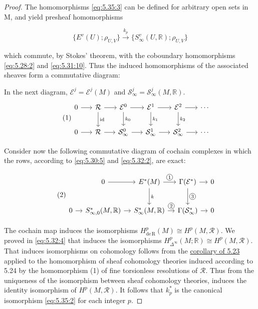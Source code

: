 \begin{proof}
The homomorphisms \eqref{eq:5.35:3} can be defined for arbitrary open sets in M, and yield presheaf homomorphisms

\[
\{E^{v}(U);\rho_{U,V}\}\xrightarrow{k_{p}}\{S_{\infty}^{v}(U,\mathbb{R});\rho_{U,V}\}
\]

which commute, by Stokes' theorem, with the coboundary homomorphisms \eqref{eq:5.28:2} and \eqref{eq:5.31:10}. Thus the induced homomorphisms of the associated sheaves form a commutative diagram:

In the next diagram, $\mathcal E^j=\mathcal E^j(M)$ and
$\mathcal S_\infty^j=\mathcal S_\infty^j(M,\mathbb R)$.
\begin{equation}
\tag{1}\label{eq:5.36:1}
\begin{tikzcd}[ampersand replacement=\&, column sep=1.6em,row sep=2em]
0 \arrow[r] \& \mathcal R \arrow[r] \arrow[d ,"{\mathrm{id}}"] \& \mathcal E^0 \arrow[r] \arrow[d ,"{k_0}"] \& \mathcal E^1 \arrow[r] \arrow[d ,"{k_1}"] \& \mathcal E^2 \arrow[r] \arrow[d ,"{k_2}"] \& \cdots \\
0 \arrow[r] \& \mathcal R \arrow[r] \& \mathcal S_\infty^0 \arrow[r] \& \mathcal S_\infty^1 \arrow[r] \& \mathcal S_\infty^2 \arrow[r] \& \cdots
\end{tikzcd}
\end{equation}

Consider now the following commutative diagram of cochain complexes in which the rows, according to \eqref{eq:5.30:5} and \eqref{eq:5.32:2}, are exact:

\begin{equation}
\tag{2}\label{eq:5.36:2}
\begin{tikzcd}[ampersand replacement=\&, column sep=1em,row sep=2.4em]
 \& 0 \arrow[r] \& E^*(M) \arrow[r ,"{\circled{1}}"] \arrow[d ,"{k}"] \& \Gamma(\mathcal E^*) \arrow[r] \arrow[d ,"{\circled{3}}"] \& 0 \\
0 \arrow[r] \& S_{\infty,0}^*(M,\mathbb R) \arrow[r] \& S_\infty^*(M,\mathbb R) \arrow[r ,"{\circled{2}}"] \& \Gamma(\mathcal S_\infty^*) \arrow[r] \& 0
\end{tikzcd}
\end{equation}

The cochain map  induces the isomorphisms $H_{\mathrm{de\,R}}^{p}(M)\cong H^{p}(M,\mathcal{R})$. We proved in \eqref{eq:5.32:4} that  induces the isomorphisms $H_{\Delta^{\infty}}^{p}(M;\mathbb{R})\cong H^{p}(M,\mathcal{R})$. That  induces isomorphisms on cohomology follows from the \hyperref[thm:5.23]{corollary of 5.23} applied to the homomorphism of sheaf cohomology theories induced according to 5.24 by the homomorphism (1) of fine torsionless resolutions of $\mathcal{R}$. Thus from the uniqueness of the isomorphism between sheaf cohomology theories,  induces the identity isomorphism of $H^{p}(M,\mathcal{R})$. It follows that $k_{p}^{*}$ is the canonical isomorphism \eqref{eq:5.35:2} for each integer $p$.

\end{proof}

